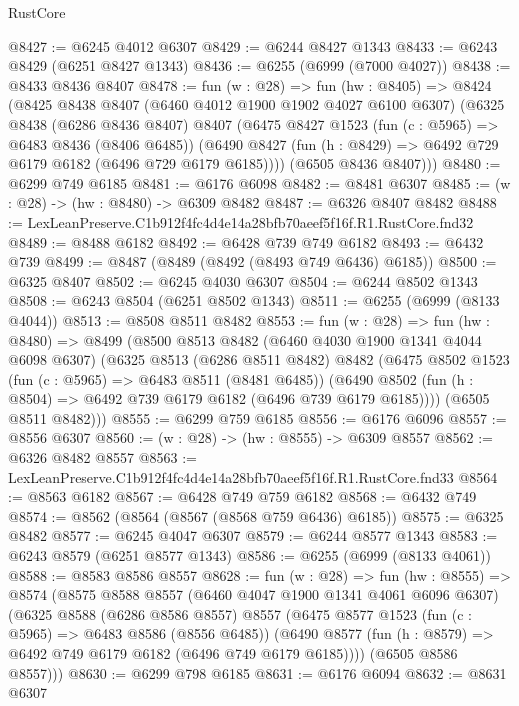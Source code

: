 \begin{lexlean}{RustCore}
\begin{coremodule}
@8427 := @6245 @4012 @6307
@8429 := @6244 @8427 @1343
@8433 := @6243 @8429 (@6251 @8427 @1343)
@8436 := @6255 (@6999 (@7000 @4027))
@8438 := @8433 @8436 @8407
@8478 := fun (w : @28) =>
  fun (hw : @8405) =>
  @8424
    (@8425
      @8438
      @8407
      (@6460 @4012 @1900 @1902 @4027 @6100 @6307)
      (@6325
        @8438
        (@6286 @8436 @8407)
        @8407
        (@6475
          @8427
          @1523
          (fun (c : @5965) => @6483 @8436 (@8406 @6485))
          (@6490 @8427 (fun (h : @8429) => @6492 @729 @6179 @6182 (@6496 @729 @6179 @6185))))
        (@6505 @8436 @8407)))
@8480 := @6299 @749 @6185
@8481 := @6176 @6098
@8482 := @8481 @6307
@8485 := (w : @28) -> (hw : @8480) -> @6309 @8482
@8487 := @6326 @8407 @8482
@8488 := LexLeanPreserve.C1b912f4fc4d4e14a28bfb70aeef5f16f.R1.RustCore.fnd32
@8489 := @8488 @6182
@8492 := @6428 @739 @749 @6182
@8493 := @6432 @739
@8499 := @8487 (@8489 (@8492 (@8493 @749 @6436) @6185))
@8500 := @6325 @8407
@8502 := @6245 @4030 @6307
@8504 := @6244 @8502 @1343
@8508 := @6243 @8504 (@6251 @8502 @1343)
@8511 := @6255 (@6999 (@8133 @4044))
@8513 := @8508 @8511 @8482
@8553 := fun (w : @28) =>
  fun (hw : @8480) =>
  @8499
    (@8500
      @8513
      @8482
      (@6460 @4030 @1900 @1341 @4044 @6098 @6307)
      (@6325
        @8513
        (@6286 @8511 @8482)
        @8482
        (@6475
          @8502
          @1523
          (fun (c : @5965) => @6483 @8511 (@8481 @6485))
          (@6490 @8502 (fun (h : @8504) => @6492 @739 @6179 @6182 (@6496 @739 @6179 @6185))))
        (@6505 @8511 @8482)))
@8555 := @6299 @759 @6185
@8556 := @6176 @6096
@8557 := @8556 @6307
@8560 := (w : @28) -> (hw : @8555) -> @6309 @8557
@8562 := @6326 @8482 @8557
@8563 := LexLeanPreserve.C1b912f4fc4d4e14a28bfb70aeef5f16f.R1.RustCore.fnd33
@8564 := @8563 @6182
@8567 := @6428 @749 @759 @6182
@8568 := @6432 @749
@8574 := @8562 (@8564 (@8567 (@8568 @759 @6436) @6185))
@8575 := @6325 @8482
@8577 := @6245 @4047 @6307
@8579 := @6244 @8577 @1343
@8583 := @6243 @8579 (@6251 @8577 @1343)
@8586 := @6255 (@6999 (@8133 @4061))
@8588 := @8583 @8586 @8557
@8628 := fun (w : @28) =>
  fun (hw : @8555) =>
  @8574
    (@8575
      @8588
      @8557
      (@6460 @4047 @1900 @1341 @4061 @6096 @6307)
      (@6325
        @8588
        (@6286 @8586 @8557)
        @8557
        (@6475
          @8577
          @1523
          (fun (c : @5965) => @6483 @8586 (@8556 @6485))
          (@6490 @8577 (fun (h : @8579) => @6492 @749 @6179 @6182 (@6496 @749 @6179 @6185))))
        (@6505 @8586 @8557)))
@8630 := @6299 @798 @6185
@8631 := @6176 @6094
@8632 := @8631 @6307

\end{coremodule}
\end{lexlean}
